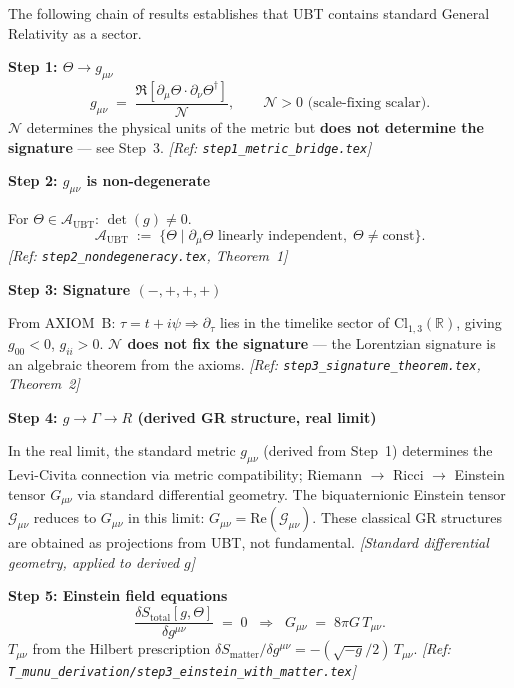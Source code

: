\documentclass[12pt]{article}
\theoremstyle{definition}
\theoremstyle{remark}
\begin{document}
\begin{tcolorbox}[colback=blue!5!white,colframe=blue!75!black,
  title=Theorem (GR Recovery Chain)]

The following chain of results establishes that UBT contains standard
General Relativity as a sector.

\medskip
\textbf{Step 1: $\Theta \to g_{\mu\nu}$}
\[
  g_{\mu\nu} \;=\; \frac{\Re[\partial_\mu\Theta \cdot \partial_\nu\Theta^\dagger]}{\mathcal{N}},
  \qquad \mathcal{N} > 0 \text{ (scale-fixing scalar)}.
\]
$\mathcal{N}$ determines the physical units of the metric but \textbf{does not
determine the signature} — see Step~3.
\hfill\textit{[Ref: \texttt{step1\_metric\_bridge.tex}]}

\medskip
\textbf{Step 2: $g_{\mu\nu}$ is non-degenerate}

For $\Theta \in \mathcal{A}_\mathrm{UBT}$: $\det(g) \neq 0$.
\[
  \mathcal{A}_\mathrm{UBT} \;:=\;
  \{\Theta \mid \partial_\mu\Theta \text{ linearly independent},\; \Theta \neq \text{const}\}.
\]
\hfill\textit{[Ref: \texttt{step2\_nondegeneracy.tex}, Theorem~1]}

\medskip
\textbf{Step 3: Signature $(-,+,+,+)$}

From AXIOM~B: $\tau = t + i\psi \Rightarrow \partial_\tau$ lies in the timelike
sector of $\mathrm{Cl}_{1,3}(\mathbb{R})$, giving $g_{00} < 0$, $g_{ii} > 0$.
\textbf{$\mathcal{N}$ does not fix the signature} — the Lorentzian signature is
an algebraic theorem from the axioms.
\hfill\textit{[Ref: \texttt{step3\_signature\_theorem.tex}, Theorem~2]}

\medskip
\textbf{Step 4: $g \to \Gamma \to R$ (derived GR structure, real limit)}

In the real limit, the standard metric $g_{\mu\nu}$ (derived from Step~1)
determines the Levi-Civita connection via metric compatibility; Riemann $\to$ Ricci $\to$
Einstein tensor $G_{\mu\nu}$ via standard differential geometry.
The biquaternionic Einstein tensor $\mathcal{G}_{\mu\nu}$ reduces to $G_{\mu\nu}$
in this limit: $G_{\mu\nu} = \mathrm{Re}(\mathcal{G}_{\mu\nu})$.
These classical GR structures are obtained as projections from UBT, not fundamental.
\hfill\textit{[Standard differential geometry, applied to derived $g$]}

\medskip
\textbf{Step 5: Einstein field equations}
\[
  \frac{\delta S_\mathrm{total}[g,\Theta]}{\delta g^{\mu\nu}} \;=\; 0
  \;\;\Longrightarrow\;\; G_{\mu\nu} \;=\; 8\pi G\, T_{\mu\nu}.
\]
$T_{\mu\nu}$ from the Hilbert prescription $\delta S_\mathrm{matter}/\delta g^{\mu\nu} =
-(\sqrt{-g}/2)\,T_{\mu\nu}$.
\hfill\textit{[Ref: \texttt{T\_munu\_derivation/step3\_einstein\_with\_matter.tex}]}


\end{tcolorbox}
\end{document}
